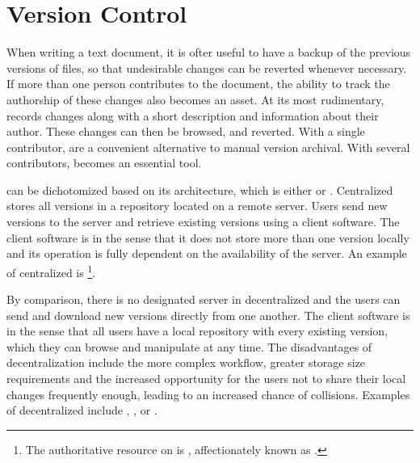
\section{Version Control}\label{sec:vcs}
When writing a text document, it is ofter useful to have a backup of the
previous versions of files, so that undesirable changes can be reverted whenever
necessary. If more than one person contributes to the document, the ability to
track the authorship of these changes also becomes an asset. At its most
rudimentary,  records changes along with a short description and
information about their author. These changes can then be browsed, and reverted.
With a single contributor,  are a convenient alternative to manual
version archival. With several contributors,  becomes an essential
tool.

 can be dichotomized based on its architecture, which is either
 or 
. Centralized  stores
all versions in a repository located on a remote server. Users send new versions
to the server and retrieve existing versions using a client software. The client
software is  in the sense that it does not store more than one
version locally and its operation is fully dependent on the availability of the
server. An example of centralized  is \footnote{
  The authoritative resource on  is ,
  affectionately known as .
}.

By comparison, there is no designated server in decentralized  and
the users can send and download new versions directly from one another. The
client software is  in the sense that all users have a local
repository with every existing version, which they can browse and manipulate
at any time. The disadvantages of decentralization include the more complex
workflow, greater storage size requirements and the increased opportunity for
the users not to share their local changes frequently enough, leading to an
increased chance of collisions. Examples of decentralized  include
, , or .

